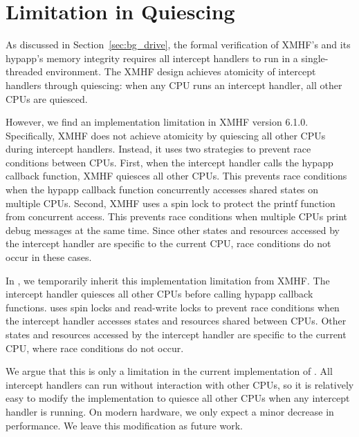 \section{Limitation in Quiescing}

As discussed in Section~\ref{sec:bg_drive}, the formal verification of XMHF's and its hypapp's memory integrity requires all intercept handlers to run in a single-threaded environment. The XMHF design achieves atomicity of intercept handlers through quiescing: when any CPU runs an intercept handler, all other CPUs are quiesced.

However, we find an implementation limitation in XMHF version 6.1.0. Specifically, XMHF does not achieve atomicity by quiescing all other CPUs during intercept handlers. Instead, it uses two strategies to prevent race conditions between CPUs. First, when the intercept handler calls the hypapp callback function, XMHF quiesces all other CPUs. This prevents race conditions when the hypapp callback function concurrently accesses shared states on multiple CPUs. Second, XMHF uses a spin lock to protect the printf function from concurrent access. This prevents race conditions when multiple CPUs print debug messages at the same time. Since other states and resources accessed by the intercept handler are specific to the current CPU, race conditions do not occur in these cases.

In , we temporarily inherit this implementation limitation from XMHF. The  intercept handler quiesces all other CPUs before calling hypapp callback functions.  uses spin locks and read-write locks to prevent race conditions when the intercept handler accesses states and resources shared between CPUs. Other states and resources accessed by the intercept handler are specific to the current CPU, where race conditions do not occur.

We argue that this is only a limitation in the current implementation of . All  intercept handlers can run without interaction with other CPUs, so it is relatively easy to modify the  implementation to quiesce all other CPUs when any intercept handler is running. On modern hardware, we only expect a minor decrease in performance. We leave this modification as future work.

